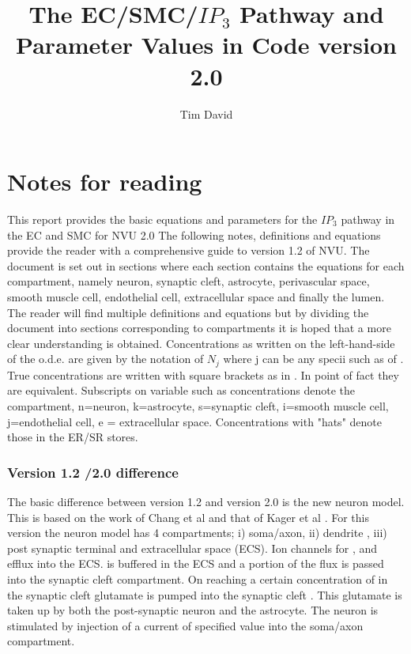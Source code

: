 \documentclass[fleqn]{report}
\numberwithin{equation}{section}
\numberwithin{equation}{section}
\newcommand{\Na}{\text{Na$^{+}$}}
\newcommand{\K}{\text{K$^+$}}
\newcommand{\Ca}{\text{Ca$^{2+}$}}
\newcommand{\Can}{\text{[Ca$^{2+}]_n$}}
\begin{document}
\author{Tim David}
\title{The EC/SMC/$IP_3$ Pathway and Parameter Values in Code version 2.0 }
\maketitle
\newpage
\linenumbers
\listoftodos 
%
%
%
%
%
\chapter{Notes for reading}
This report provides the basic equations and parameters for the $IP_3$  pathway in the EC and SMC for NVU 2.0 
The following notes, definitions and equations provide the reader with a comprehensive guide to version 1.2 of NVU. The document is set out in sections where each section contains the equations for each compartment, namely neuron, synaptic cleft, astrocyte, perivascular space, smooth muscle cell, endothelial cell, extracellular space and finally the lumen. The reader will find multiple definitions and equations but by dividing the document into sections corresponding to compartments it is hoped that a more clear understanding is obtained.
Concentrations as written on the left-hand-side of the o.d.e. are given by the notation of $N_j$ where j can be any specii such as \Na of \Ca. True concentrations are written with square brackets as in \Can . In point of fact they are equivalent.
Subscripts on variable such as concentrations denote the compartment, n=neuron, k=astrocyte, s=synaptic cleft, i=smooth muscle cell, j=endothelial cell, e = extracellular space.  Concentrations with "hats" denote those in the ER/SR stores. 
\subsection{Version 1.2 /2.0 difference}
 The basic difference between version 1.2 and version 2.0 is the new neuron model. This is based on the work of Chang et al \cite{Chang2013}	and that of Kager et al \cite{Kager2000a}. For this version the neuron model has  4 compartments; i) soma/axon, ii) dendrite , iii) post synaptic terminal and extracellular space (ECS). Ion channels for \Na, and \K efflux into the ECS.  \K is buffered in the ECS and a portion of the \K flux is passed into the synaptic cleft compartment. On reaching a certain concentration of \K in the synaptic cleft  glutamate is pumped into the synaptic cleft . This glutamate is taken up by both the post-synaptic neuron and the astrocyte. The neuron is stimulated by injection of a current of specified value into the soma/axon compartment. 
 
\end{document}
